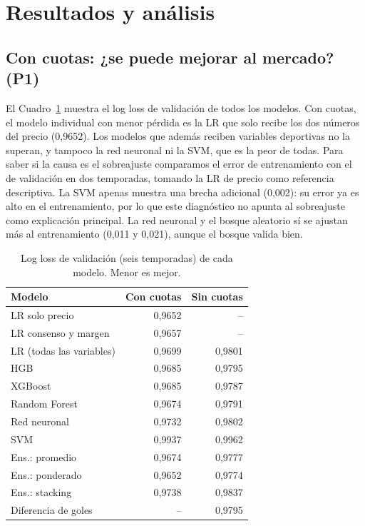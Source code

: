 \documentclass[conference]{IEEEtran}
\begin{document}
\FloatBarrier
\section{Resultados y análisis}
\label{sec:resultados}
\subsection{Con cuotas: ¿se puede mejorar al mercado? (P1)}
El Cuadro~\ref{tab:familias} muestra el log loss de validación de todos los modelos. Con cuotas, el modelo individual con menor pérdida es la LR que solo recibe los dos números del precio (0{,}9652). Los modelos que además reciben variables deportivas no la superan, y tampoco la red neuronal ni la SVM, que es la peor de todas. Para saber si la causa es el sobreajuste comparamos el error de entrenamiento con el de validación en dos temporadas, tomando la LR de precio como referencia descriptiva. La SVM apenas muestra una brecha adicional (0{,}002): su error ya es alto en el entrenamiento, por lo que este diagnóstico no apunta al sobreajuste como explicación principal. La red neuronal y el bosque aleatorio sí se ajustan más al entrenamiento (0{,}011 y 0{,}021), aunque el bosque valida bien.
\begin{table}[!htb]
\caption{Log loss de validación (seis temporadas) de cada modelo. Menor es mejor.}
\centering\footnotesize
\begin{tabular}{lrr}
\toprule
Modelo & Con cuotas & Sin cuotas \\
\midrule
LR solo precio & 0{,}9652 & -- \\
LR consenso y margen & 0{,}9657 & -- \\
LR (todas las variables) & 0{,}9699 & 0{,}9801 \\
HGB & 0{,}9685 & 0{,}9795 \\
XGBoost & 0{,}9685 & 0{,}9787 \\
Random Forest & 0{,}9674 & 0{,}9791 \\
Red neuronal & 0{,}9732 & 0{,}9802 \\
SVM & 0{,}9937 & 0{,}9962 \\
Ens.: promedio & 0{,}9674 & 0{,}9777 \\
Ens.: ponderado & 0{,}9652 & 0{,}9774 \\
Ens.: stacking & 0{,}9738 & 0{,}9837 \\
Diferencia de goles & -- & 0{,}9795 \\
\bottomrule
\end{tabular}
\label{tab:familias}
\end{table}
\end{document}
